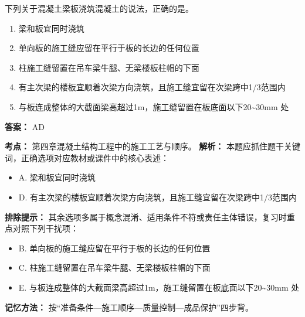 \documentclass[UTF8,fontset=fandol,11pt]{ctexart}
\begin{document}
\begin{quizbox}[title={第 76 题}]
下列关于混凝土梁板浇筑混凝土的说法，正确的是。\\
\begin{enumerate}[label=\Alph*.]
\item 梁和板宜同时浇筑
\item 单向板的施工缝应留在平行于板的长边的任何位置
\item 柱施工缝留置在吊车梁牛腿、无梁楼板柱帽的下面
\item 有主次梁的楼板宜顺着次梁方向浇筑，且施工缝宜留在次梁跨中1/3范围内
\item 与板连成整体的大截面梁高超过1m，施工缝留置在板底面以下20\textasciitilde{}30mm 处
\end{enumerate}
\textbf{答案：} AD
\vspace{0.25em}
\begin{answerbox}[title={考点解析}]
\textbf{考点：} 第四章混凝土结构工程中的施工工艺与顺序。
\textbf{解析：} 本题应抓住题干关键词，正确选项对应教材或课件中的核心表述：
\begin{itemize}
\item A. 梁和板宜同时浇筑
\item D. 有主次梁的楼板宜顺着次梁方向浇筑，且施工缝宜留在次梁跨中1/3范围内
\end{itemize}
\textbf{排除提示：} 其余选项多属于概念混淆、适用条件不符或责任主体错误，复习时重点对照下列干扰项：
\begin{itemize}
\item B. 单向板的施工缝应留在平行于板的长边的任何位置
\item C. 柱施工缝留置在吊车梁牛腿、无梁楼板柱帽的下面
\item E. 与板连成整体的大截面梁高超过1m，施工缝留置在板底面以下20\textasciitilde{}30mm 处
\end{itemize}
\textbf{记忆方法：} 按“准备条件—施工顺序—质量控制—成品保护”四步背。
\end{answerbox}
\end{quizbox}

\vspace{0.2em}
\end{document}
